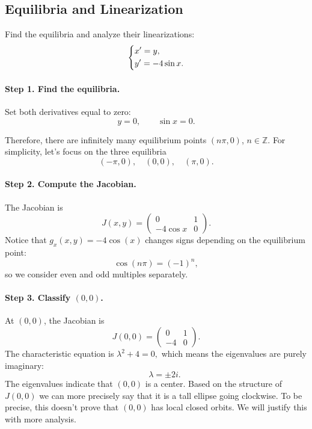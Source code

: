 \documentclass[11pt,letterpaper]{article}
\begin{document}
\subsection{Equilibria and Linearization}

\begin{example}[1]{
Find the equilibria and analyze their linearizations:
\[
\begin{dcases}
x'=y,\\
y'=-4\sin x.
\end{dcases}
\]
}

\paragraph{Step 1. Find the equilibria.}
Set both derivatives equal to zero:
\[
y=0,\qquad \sin x=0.
\]

Therefore, there are infinitely many equilibrium points
$(n\pi,0)$,  $n\in\mathbb Z.$
For simplicity, let's focus on the three equilibria 
$$
\boxed{(-\pi,0), \quad (0,0),\quad (\pi,0)}.
$$

\paragraph{Step 2. Compute the Jacobian.}
The Jacobian is
\[
\boxed{
J(x,y)=
\begin{pmatrix}
0&1\\
-4\cos x&0
\end{pmatrix}.
}
\]
Notice that $g_x(x,y)=-4\cos(x)$ changes signs depending on the equilibrium point:
\[
\cos(n\pi)=(-1)^n,
\]
so we consider even and odd multiples separately.

\paragraph{Step 3. Classify $(0,0)$.}
At $(0,0)$, the Jacobian is
\[
J(0,0)=
\begin{pmatrix}
0&1\\
-4&0
\end{pmatrix}.
\]
The characteristic equation is $\lambda^2+4=0,$ which means the eigenvalues are purely imaginary: 
$$
\qquad \lambda=\pm2i.
$$
The eigenvalues indicate that $(0,0)$ is a center. Based on the structure of $J(0,0)$ we can more precisely say that it is a tall ellipse going clockwise. To be precise, this doesn't prove that $(0,0)$ has local closed orbits. We will justify this with more analysis.


\end{example}
\end{document}
